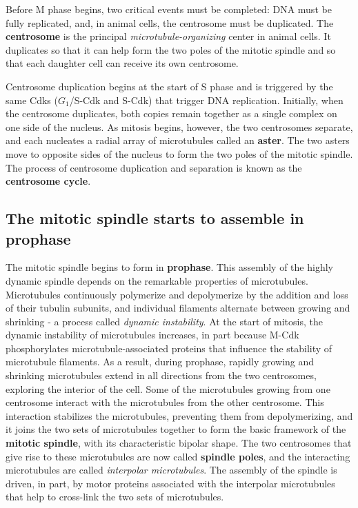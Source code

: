 Before M phase begins, two critical events must be completed: DNA must
be fully replicated, and, in animal cells, the centrosome must be duplicated.
The \textbf{centrosome} is the principal \textit{microtubule-organizing} center
in animal cells. It duplicates so that it can help form the two poles of
the mitotic spindle and so that each daughter cell can receive its own
centrosome.

Centrosome duplication begins at the start of S phase and is triggered
by the same Cdks ($G_1$/S-Cdk and S-Cdk) that trigger DNA replication.
Initially, when the centrosome duplicates, both copies remain together
as a single complex on one side of the nucleus. As mitosis begins, however,
the two centrosomes separate, and each nucleates a radial array of
microtubules called an \textbf{aster}. The two asters move to opposite sides of
the nucleus to form the two poles of the mitotic spindle.
The process of centrosome duplication and separation is known as the
\textbf{centrosome cycle}.

\subsection{The mitotic spindle starts to assemble in prophase}

The mitotic spindle begins to form in \textbf{prophase}. This assembly of the
highly dynamic spindle depends on the remarkable properties of microtubules.
Microtubules continuously polymerize
and depolymerize by the addition and loss of their tubulin subunits, and
individual filaments alternate between growing and shrinking - a process
called \textit{dynamic instability}. At the start of mitosis, the
dynamic instability of microtubules increases, in part because M-Cdk
phosphorylates microtubule-associated proteins that influence the stability
of microtubule filaments. As a result, during prophase, rapidly growing
and shrinking microtubules extend in all directions from the two centrosomes,
exploring the interior of the cell. Some of the microtubules
growing from one centrosome interact with the microtubules from the
other centrosome. This interaction stabilizes the microtubules, preventing
them from depolymerizing, and it joins the two sets of microtubules
together to form the basic framework of the \textbf{mitotic spindle}, with its
characteristic bipolar shape. The two centrosomes that give
rise to these microtubules are now called \textbf{spindle poles}, and the interacting
microtubules are called \textit{interpolar microtubules}. The
assembly of the spindle is driven, in part, by motor proteins associated
with the interpolar microtubules that help to cross-link the two sets of
microtubules.

